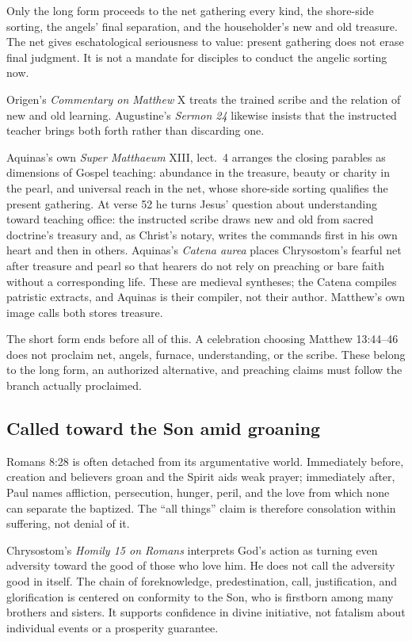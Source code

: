 Only the long form proceeds to the net gathering every kind, the shore-side sorting, the angels' final separation, and the householder's new and old treasure. The net gives eschatological seriousness to value: present gathering does not erase final judgment. It is not a mandate for disciples to conduct the angelic sorting now.

Origen's \emph{Commentary on Matthew} X treats the trained scribe and the relation of new and old learning. Augustine's \emph{Sermon 24} likewise insists that the instructed teacher brings both forth rather than discarding one.

Aquinas's own \emph{Super Matthaeum} XIII, lect.~4 arranges the closing parables as dimensions of Gospel teaching: abundance in the treasure, beauty or charity in the pearl, and universal reach in the net, whose shore-side sorting qualifies the present gathering. At verse 52 he turns Jesus' question about understanding toward teaching office: the instructed scribe draws new and old from sacred doctrine's treasury and, as Christ's notary, writes the commands first in his own heart and then in others. Aquinas's \emph{Catena aurea} places Chrysostom's fearful net after treasure and pearl so that hearers do not rely on preaching or bare faith without a corresponding life. These are medieval syntheses; the Catena compiles patristic extracts, and Aquinas is their compiler, not their author. Matthew's own image calls both stores treasure.

The short form ends before all of this. A celebration choosing Matthew 13:44--46 does not proclaim net, angels, furnace, understanding, or the scribe. These belong to the long form, an authorized alternative, and preaching claims must follow the branch actually proclaimed.

\sectionguard
\subsection*{Called toward the Son amid groaning\enspace{}}

Romans 8:28 is often detached from its argumentative world. Immediately before, creation and believers groan and the Spirit aids weak prayer; immediately after, Paul names affliction, persecution, hunger, peril, and the love from which none can separate the baptized. The ``all things'' claim is therefore consolation within suffering, not denial of it.

Chrysostom's \emph{Homily 15 on Romans} interprets God's action as turning even adversity toward the good of those who love him. He does not call the adversity good in itself. The chain of foreknowledge, predestination, call, justification, and glorification is centered on conformity to the Son, who is firstborn among many brothers and sisters. It supports confidence in divine initiative, not fatalism about individual events or a prosperity guarantee.

